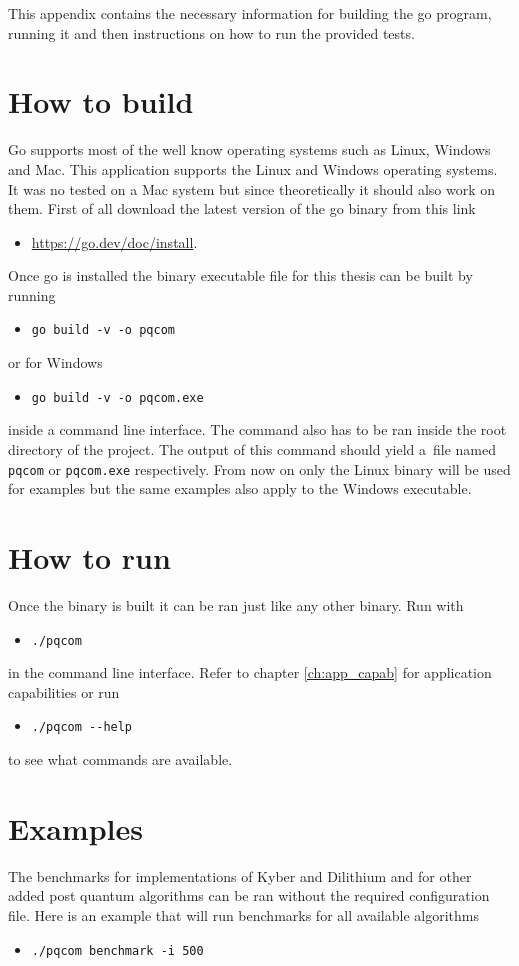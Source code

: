 This appendix contains the necessary information for building the go program, running it and then instructions on how to run the provided tests.

\section{How to build}
Go supports most of the well know operating systems such as Linux, Windows and Mac. This application supports the Linux and Windows operating systems. It was no tested on a Mac system but since theoretically it should also work on them. First of all download the latest version of the go binary from this link
\begin{itemize}
  \item \url{https://go.dev/doc/install}.
\end{itemize}
Once go is installed the binary executable file for this thesis can be built by running
\begin{itemize}
  \item \texttt{go build -v -o pqcom}
\end{itemize}
or for Windows
\begin{itemize}
  \item \texttt{go build -v -o pqcom.exe}
\end{itemize}
inside a command line interface. The command also has to be ran inside the root directory of the project. The output of this command should yield a~file named \texttt{pqcom} or \texttt{pqcom.exe} respectively. From now on only the Linux binary will be used for examples but the same examples also apply to the Windows executable.
\section{How to run}
Once the binary is built it can be ran just like any other binary. Run with
\begin{itemize}
  \item \texttt{./pqcom}
\end{itemize}
in the command line interface. Refer to chapter \ref{ch:app_capab} for application capabilities or run
\begin{itemize}
  \item \texttt{./pqcom -\--help}
\end{itemize}
to see what commands are available.

\section{Examples}
The benchmarks for implementations of Kyber and Dilithium and for other added post quantum algorithms can be ran without the required configuration file. Here is an example that will run benchmarks for all available algorithms
\begin{itemize}
  \item \texttt{./pqcom benchmark -i 500}
\end{itemize}

